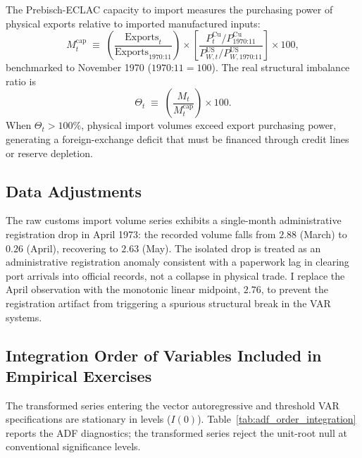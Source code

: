 The Prebisch-ECLAC capacity to import measures the purchasing power of physical exports relative to imported manufactured inputs:
\begin{equation}
	M^{\text{cap}}_t \;\equiv\; \left(\frac{\text{Exports}_t}{\text{Exports}_{1970\text{:}11}}\right) \times \left[\frac{P^{\text{Cu}}_t / P^{\text{Cu}}_{1970\text{:}11}}{P^{\text{US}}_{W,t} / P^{\text{US}}_{W,1970\text{:}11}}\right] \times 100,
	\label{eq:mcap}
\end{equation}
benchmarked to November 1970 ($1970\text{:}11 = 100$). The real structural imbalance ratio is
\begin{equation}
	\Theta_t \;\equiv\; \left(\frac{M_t}{M^{\text{cap}}_t}\right) \times 100.
	\label{eq:theta}
\end{equation}
When $\Theta_t > 100\%$, physical import volumes exceed export purchasing power, generating a foreign-exchange deficit that must be financed through credit lines or reserve depletion.

\subsection{Data Adjustments}
\label{sec:data_adjustments}

The raw customs import volume series exhibits a single-month administrative registration drop in April 1973: the recorded volume falls from $2.88$ (March) to $0.26$ (April), recovering to $2.63$ (May). The isolated drop is treated as an administrative registration anomaly consistent with a paperwork lag in clearing port arrivals into official records, not a collapse in physical trade. I replace the April observation with the monotonic linear midpoint, $2.76$, to prevent the registration artifact from triggering a spurious structural break in the VAR systems.

\subsection{Integration Order of Variables Included in Empirical Exercises}

The transformed series entering the vector autoregressive and threshold VAR specifications are stationary in levels ($I(0)$). Table~\ref{tab:adf_order_integration} reports the ADF diagnostics; the transformed series reject the unit-root null at conventional significance levels. 

